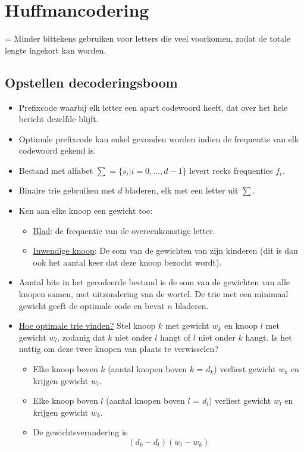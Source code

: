 \documentclass{report}
\begin{document}
\section{Huffmancodering}
= Minder bittekens gebruiken voor letters die veel voorkomen, zodat de totale lengte ingekort kan worden.
\subsection{Opstellen decoderingsboom}
\begin{itemize}
	\item[\info] Prefixcode waarbij elk letter een apart codewoord heeft, dat over het hele bericht dezelfde blijft.
	\item[\info] Optimale prefixcode kan enkel gevonden worden indien de frequentie van elk codewoord gekend is.
	\item[\info] Bestand met alfabet $\sum = \{s_i | i = 0, ..., d - 1\}$ levert reeks frequenties $f_i$. 
	\item[\info] Binaire trie gebruiken met $d$ bladeren, elk met een letter uit $\sum$.
	\item[\info] Ken aan elke knoop een gewicht toe:
	\begin{itemize}
		\item[\info] \underline{Blad}: de frequentie van de overeenkomstige letter.
		\item[\info] \underline{Inwendige knoop}: De som van de gewichten van zijn kinderen (dit is dan ook het aantal keer dat deze knoop bezocht wordt).
	\end{itemize}
	\item[\info] Aantal bits in het gecodeerde bestand is de som van de gewichten van alle knopen samen, met uitzondering van de wortel. De trie met een minimaal gewicht geeft de optimale code en bevat $n$ bladeren.
	\item[\info] \underline{ Hoe optimale trie vinden?} Stel knoop $k$ met gewicht $w_k$ en knoop $l$ met gewicht $w_l$, zodanig dat $k$ niet onder $l$ hangt of $l$ niet onder $k$ hangt. Is het nuttig om deze twee knopen van plaats te verwisselen?
	\begin{itemize}
		\item Elke knoop boven $k$ (aantal knopen boven $k$ = $d_k$) verliest gewicht $w_k$ en krijgen gewicht $w_l$.
		\item Elke knoop boven $l$ (aantal knopen boven $l$ = $d_l$) verliest gewicht $w_l$ en krijgen gewicht $w_k$.
		\item De gewichtsverandering is $$(d_k - d_l)(w_l - w_k)$$

\end{itemize}
\end{itemize}
\end{document}
